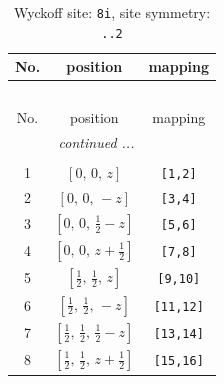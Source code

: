 \documentclass[fleqn,8pt]{jsarticle}
\begin{document}
\begin{longtable}{ccc}
\caption{Wyckoff site: {\tt 8i}, site symmetry: {\tt ..2}}
 \\
 \hline \hline
No. & position & mapping \\ \hline \endfirsthead

\multicolumn{2}{l}{\tablename\ \thetable{}} \\
 \hline \hline
No. & position & mapping \\ \hline \endhead

 \hline \hline
\multicolumn{2}{r}{\footnotesize\it continued ...} \\ \endfoot

 \hline \hline
\multicolumn{2}{r}{} \\ \endlastfoot

1 & $\left[ 0,\, 0,\, z \right]$ & {\tt [1,2]} \\ \hline
2 & $\left[ 0,\, 0,\, - z \right]$ & {\tt [3,4]} \\ \hline
3 & $\left[ 0,\, 0,\, \frac{1}{2} - z \right]$ & {\tt [5,6]} \\ \hline
4 & $\left[ 0,\, 0,\, z + \frac{1}{2} \right]$ & {\tt [7,8]} \\ \hline
5 & $\left[ \frac{1}{2},\, \frac{1}{2},\, z \right]$ & {\tt [9,10]} \\ \hline
6 & $\left[ \frac{1}{2},\, \frac{1}{2},\, - z \right]$ & {\tt [11,12]} \\ \hline
7 & $\left[ \frac{1}{2},\, \frac{1}{2},\, \frac{1}{2} - z \right]$ & {\tt [13,14]} \\ \hline
8 & $\left[ \frac{1}{2},\, \frac{1}{2},\, z + \frac{1}{2} \right]$ & {\tt [15,16]} \\
\end{longtable}
\renewcommand{\arraystretch}{1.2}
\end{document}
